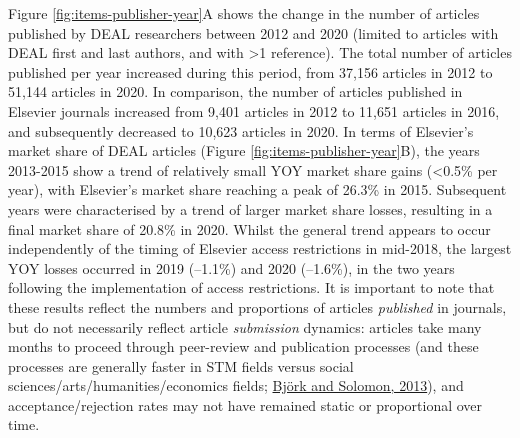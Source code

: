 \documentclass[
]{article}
\begin{document}
Figure \ref{fig:items-publisher-year}A shows the change in the number of articles published by DEAL researchers between 2012 and 2020 (limited to articles with DEAL first and last authors, and with \textgreater1 reference). The total number of articles published per year increased during this period, from 37,156 articles in 2012 to 51,144 articles in 2020. In comparison, the number of
articles published in Elsevier journals increased from 9,401 articles in 2012 to 11,651 articles in 2016, and subsequently decreased to 10,623 articles in 2020. In terms of Elsevier's market share of DEAL articles (Figure \ref{fig:items-publisher-year}B), the years 2013-2015 show a trend of relatively small YOY market share gains (\textless0.5\% per year), with Elsevier's market share reaching a peak of 26.3\% in 2015. Subsequent years were characterised by a trend of larger market share losses, resulting in a final market share of 20.8\% in 2020. Whilst the general trend appears to occur independently of the timing of Elsevier access restrictions in mid-2018, the largest YOY losses occurred in 2019 (--1.1\%) and 2020 (--1.6\%), in the two years following the implementation of access restrictions. It is important to note that these results reflect the numbers and proportions of articles \emph{published} in journals, but do not necessarily reflect article \emph{submission} dynamics: articles take many months to proceed through peer-review and publication processes (and these processes are generally faster in STM fields versus social sciences/arts/humanities/economics fields; \href{https://doi.org/10.1016/j.joi.2013.09.001}{Björk and Solomon, 2013}), and acceptance/rejection rates may not have remained static or proportional over time.
\end{document}
